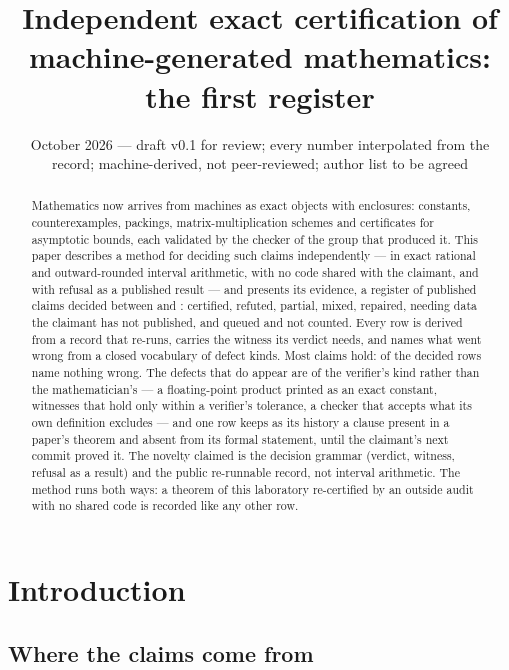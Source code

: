 \documentclass[11pt]{article}
\title{Independent exact certification of machine-generated mathematics:\\ the first register}
\author{\cmauthor}
\date{October 2026 --- draft v0.1 for review; every number interpolated from the record; machine-derived, not peer-reviewed; author list to be agreed}
\theoremstyle{plain}
\theoremstyle{definition}
\begin{document}
\maketitle

\begin{abstract}
Mathematics now arrives from machines as exact objects with enclosures: constants, counterexamples, packings, matrix-multiplication schemes and certificates for asymptotic bounds, each validated by the checker of the group that produced it. This paper describes a method for deciding such claims independently --- in exact rational and outward-rounded interval arithmetic, with no code shared with the claimant, and with refusal as a published result --- and presents its evidence, a register of \RegRows{} published claims decided between \RegFirstDate{} and \RegLastDate{}: \VCertified{} certified, \VRefuted{} refuted, \VPartial{} partial, \VMixed{} mixed, \VRepaired{} repaired, \VNeedsData{} needing data the claimant has not published, and \VQueued{} queued and not counted. Every row is derived from a record that re-runs, carries the witness its verdict needs, and names what went wrong from a closed vocabulary of \RegKinds{} defect kinds. Most claims hold: \RegHolds{} of the \RegDecided{} decided rows name nothing wrong. The defects that do appear are of the verifier's kind rather than the mathematician's --- a floating-point product printed as an exact constant, witnesses that hold only within a verifier's tolerance, a checker that accepts what its own definition excludes --- and one row keeps as its history a clause present in a paper's theorem and absent from its formal statement, until the claimant's next commit proved it. The novelty claimed is the decision grammar (verdict, witness, refusal as a result) and the public re-runnable record, not interval arithmetic. The method runs both ways: a theorem of this laboratory re-certified by an outside audit with no shared code is recorded like any other row.
\end{abstract}

\section{Introduction}

\subsection{Where the claims come from}
\end{document}
